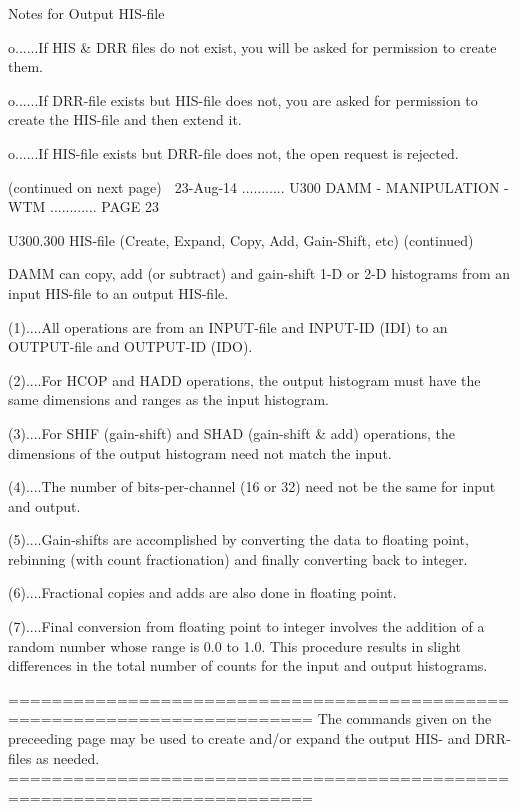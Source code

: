    Notes for Output HIS-file
 
   o......If  HIS  &  DRR files do not exist, you will be asked for permission
          to create them.
 
   o......If DRR-file  exists  but  HIS-file  does  not,  you  are  asked  for
          permission to create the HIS-file and then extend it.
 
   o......If  HIS-file  exists  but  DRR-file  does  not,  the open request is
          rejected.
 
                            (continued on next page)
    
   23-Aug-14 ........... U300  DAMM - MANIPULATION - WTM ............ PAGE  23
 
 
   U300.300  HIS-file (Create, Expand, Copy, Add, Gain-Shift, etc) (continued)
 
   DAMM can copy, add (or subtract) and gain-shift 1-D or 2-D histograms  from
   an input HIS-file to an output HIS-file.
 
   (1)....All  operations  are  from  an  INPUT-file  and INPUT-ID (IDI) to an
          OUTPUT-file and OUTPUT-ID (IDO).
 
   (2)....For HCOP and HADD operations, the output  histogram  must  have  the
          same dimensions and ranges as the input histogram.
 
   (3)....For  SHIF  (gain-shift)  and SHAD (gain-shift & add) operations, the
          dimensions of the output histogram need not match the input.
 
   (4)....The number of bits-per-channel (16 or 32) need not be the  same  for
          input and output.
 
   (5)....Gain-shifts  are  accomplished  by  converting  the data to floating
          point, rebinning (with count fractionation) and  finally  converting
          back to integer.
 
   (6)....Fractional copies and adds are also done in floating point.
 
   (7)....Final  conversion  from  floating  point  to  integer  involves  the
          addition of a  random  number  whose  range  is  0.0  to  1.0.  This
          procedure  results  in  slight  differences  in  the total number of
          counts for the input and output histograms.
 
   ==========================================================================
   The commands given on the preceeding page may be used to create and/or
   expand the output HIS- and DRR-files as needed.
   ==========================================================================
 
